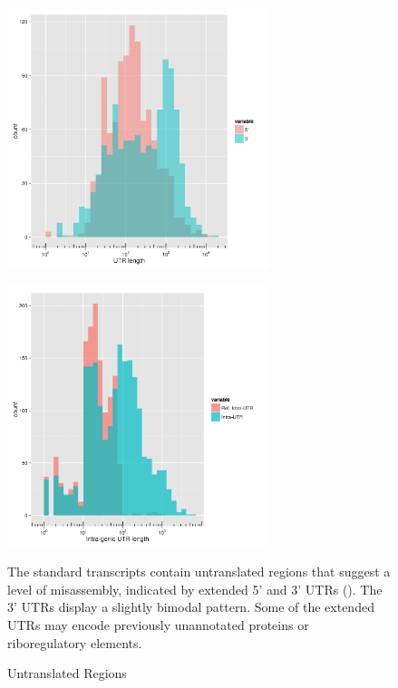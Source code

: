 \begin{figure}
\small
\begin{center}
\begin{minipage}{.5\textwidth}
\begin{center}
{\includegraphics[width=\linewidth,height=3in]{images/Assembly/Summary/futrlength.png}
\label{fig:5.4a}}
\end{center}
\end{minipage}%
\begin{minipage}{.5\textwidth}
\begin{center}
{\includegraphics[width=\linewidth,height=3in]{images/Assembly/Summary/fintrautrlength_1.png}
\label{fig:5.4b}}
\end{center}
\end{minipage}
\end{center}
\caption{Untranslated Regions}
The standard transcripts contain untranslated regions that suggest a level of misassembly, indicated by extended 5' and 3' UTRs (). The 3' UTRs display a slightly bimodal pattern. Some of the extended UTRs may encode previously unannotated proteins or riboregulatory elements.
\end{figure}

